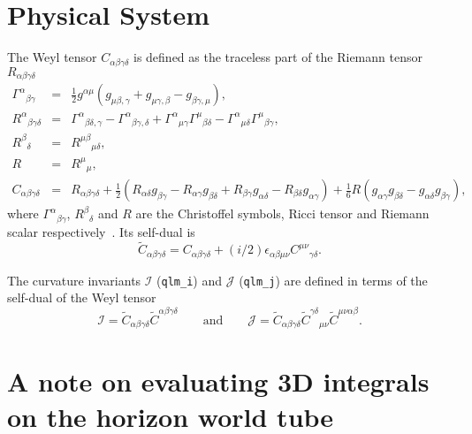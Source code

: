 \section{Physical System}

The Weyl tensor $C_{\alpha\beta\gamma\delta}$ is defined as the traceless part
of the Riemann tensor $R_{\alpha\beta\gamma\delta}$
\begin{eqnarray}
{\Gamma^{\alpha}}_{\beta\gamma} &=& \frac12 g^{\alpha\mu} \left(
g_{\mu\beta,\gamma}+g_{\mu\gamma,\beta} - g_{\beta\gamma,\mu}
\right), \\
{R^\alpha}_{\beta\gamma\delta} &=&
{\Gamma^\alpha}_{\beta\delta,\gamma} -
{\Gamma^\alpha}_{\beta\gamma,\delta} +
{\Gamma^\alpha}_{\mu\gamma} {\Gamma^\mu}_{\beta\delta} -
{\Gamma^\alpha}_{\mu\delta} {\Gamma^\mu}_{\beta\gamma},
\\
{R^\beta}_\delta &=& {R^{\mu\beta}}_{\mu\delta}, \\
R &=& {R^\mu}_\mu, \\
C_{\alpha\beta\gamma\delta} &=&
R_{\alpha\beta\gamma\delta}+
{\frac {1}{2}}\left(R_{\alpha\delta}g_{\beta\gamma}-R_{\alpha\gamma}g_{\beta\delta}+R_{\beta\gamma}g_{\alpha\delta}-R_{\beta\delta}g_{\alpha\gamma}\right)+
{\frac {1}{6}}R\left(g_{\alpha\gamma}g_{\beta\delta}-g_{\alpha\delta}g_{\beta\gamma}\right),
\end{eqnarray}
where ${\Gamma^{\alpha}}_{\beta\gamma}$, ${R^\beta}_\delta$ and $R$ are the
Christoffel symbols, Ricci tensor and Riemann scalar
respectively~\cite{EinsteinAnalysis_QuasiLocalMeasures_Misner:1974qy}. Its
self-dual is
\begin{equation}
\tilde C_{\alpha\beta\gamma\delta} =
C_{\alpha\beta\gamma\delta} +
(i/2)\epsilon_{\alpha\beta\mu\nu} {C^{\mu\nu}}_{\gamma\delta}.
\end{equation}

The curvature invariants $\mathcal{I}$ (\texttt{qlm\_i}) and $\mathcal{J}$
(\texttt{qlm\_j}) are defined in terms of the self-dual of the Weyl
tensor~\cite{EinsteinAnalysis_QuasiLocalMeasures_Baker:2001sf}
\begin{equation}
\mathcal{I} = \tilde C_{\alpha\beta\gamma\delta}
\tilde C^{\alpha\beta\gamma\delta}
\qquad\mbox{and}\qquad
\mathcal{J} = \tilde C_{\alpha\beta\gamma\delta}
{\tilde C^{\gamma\delta}}_{\mu\nu}
\tilde C^{\mu\nu\alpha\beta}.
\end{equation}

\section{A note on evaluating 3D integrals on the horizon world tube}

